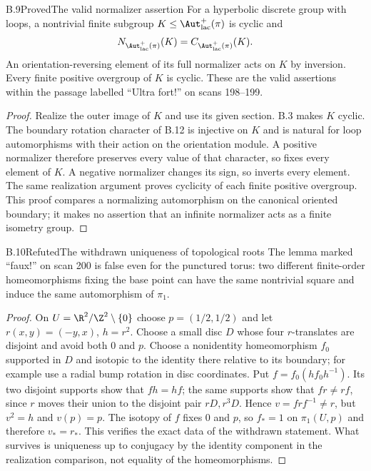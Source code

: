 \begin{claim}{B.9}{Proved}{The valid normalizer assertion}
For a hyperbolic discrete group with loops, a nontrivial finite subgroup
$K\le\Aut^+_{\rm lac}(\pi)$ is cyclic and
\[
 N_{\Aut^+_{\rm lac}(\pi)}(K)=C_{\Aut^+_{\rm lac}(\pi)}(K).
\]
An orientation-reversing element of its full normalizer acts on $K$ by inversion.
Every finite positive overgroup of $K$ is cyclic. These are the valid assertions
within the passage labelled ``Ultra fort!'' on scans 198--199.
\end{claim}
\begin{proof}
Realize the outer image of $K$ and use its given section. B.3 makes $K$ cyclic.
The boundary rotation character of B.12 is injective on $K$ and is natural for
loop automorphisms with their action on the orientation module. A positive
normalizer therefore preserves every value of that character, so fixes every
element of $K$. A negative normalizer changes its sign, so inverts every element.
The same realization argument proves cyclicity of each finite positive overgroup.
This proof compares a normalizing automorphism on the canonical oriented boundary;
it makes no assertion that an infinite normalizer acts as a finite isometry group.
\end{proof}

\begin{claim}{B.10}{Refuted}{The withdrawn uniqueness of topological roots}
The lemma marked ``faux!'' on scan 200 is false even for the punctured torus:
two different finite-order homeomorphisms fixing the base point can have the
same nontrivial square and induce the same automorphism of $\pi_1$.
\end{claim}
\begin{proof}
On $U=\R^2/\Z^2\setminus\{0\}$ choose $p=(1/2,1/2)$ and let
$r(x,y)=(-y,x)$, $h=r^2$. Choose a small disc $D$ whose four $r$-translates are
disjoint and avoid both $0$ and $p$. Choose a nonidentity homeomorphism $f_0$
supported in $D$ and isotopic to the identity there relative to its boundary;
for example use a radial bump rotation in disc coordinates. Put
$f=f_0(hf_0h^{-1})$. Its two disjoint supports show that $fh=hf$; the same
supports show that $fr\ne rf$, since $r$ moves their union to the disjoint pair
$rD,r^3D$. Hence $v=frf^{-1}\ne r$, but $v^2=h$ and $v(p)=p$.
The isotopy of $f$ fixes $0$ and $p$, so $f_*=1$ on $\pi_1(U,p)$ and therefore
$v_*=r_*$. This verifies the exact data of the withdrawn statement. What survives
is uniqueness up to conjugacy by the identity component in the realization
comparison, not equality of the homeomorphisms.
\end{proof}

